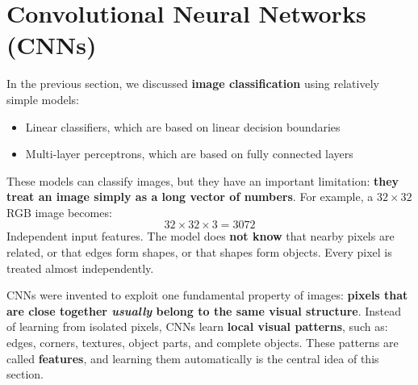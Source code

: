 \section{Convolutional Neural Networks (CNNs)}\label{sec:convolutional-neural-networks}

In the previous section, we discussed \textbf{image classification} using relatively simple models:
\begin{itemize}
    \item Linear classifiers, which are based on linear decision boundaries
    \item Multi-layer perceptrons, which are based on fully connected layers
\end{itemize}
These models can classify images, but they have an important limitation: \textbf{they treat an image simply as a long vector of numbers}. For example, a $32 \times 32$ RGB image becomes:
\begin{equation*}
    32 \times 32 \times 3 = 3072
\end{equation*}
Independent input features. The model does \textbf{not know} that nearby pixels are related, or that edges form shapes, or that shapes form objects. Every pixel is treated almost independently.

\highspace
CNNs were invented to exploit one fundamental property of images: \textbf{pixels that are close together \emph{usually} belong to the same visual structure}. Instead of learning from isolated pixels, CNNs learn \textbf{local visual patterns}, such as: edges, corners, textures, object parts, and complete objects. These patterns are called \textbf{features}, and learning them automatically is the central idea of this section.